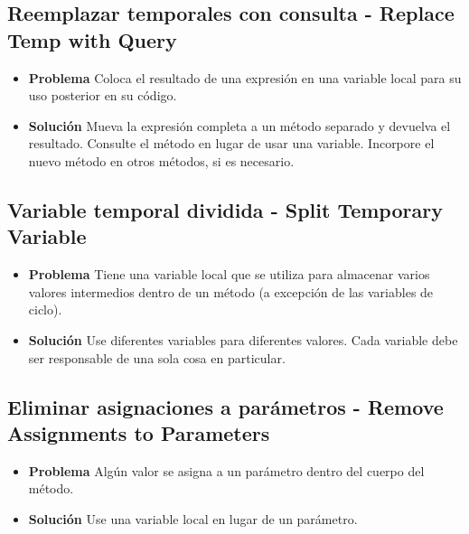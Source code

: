 \documentclass[11pt,a4paper,oneside]{book}
\begin{document}
\subsection{Reemplazar temporales con consulta - Replace Temp with Query}
\label{replacetempwithquery}
\begin{itemize}
    \item \textbf{Problema} Coloca el resultado de una expresión en una variable local para su uso posterior en su código.
    
    \item \textbf{Solución} Mueva la expresión completa a un método separado y devuelva el resultado. Consulte el método en lugar de usar una variable. Incorpore el nuevo método en otros métodos, si es necesario.
    
\end{itemize}

\subsection{Variable temporal dividida - Split Temporary Variable}
\label{splittemporaryvariable}
\begin{itemize}
    \item \textbf{Problema} Tiene una variable local que se utiliza para almacenar varios valores intermedios dentro de un método (a excepción de las variables de ciclo).
    
    \item \textbf{Solución} Use diferentes variables para diferentes valores. Cada variable debe ser responsable de una sola cosa en particular.
    
\end{itemize}

\subsection{Eliminar asignaciones a parámetros - Remove Assignments to Parameters}
\label{removeassignmentstoparameters}
\begin{itemize}
    \item \textbf{Problema} Algún valor se asigna a un parámetro dentro del cuerpo del método.
    
    \item \textbf{Solución} Use una variable local en lugar de un parámetro.
    
\end{itemize}
\end{document}
